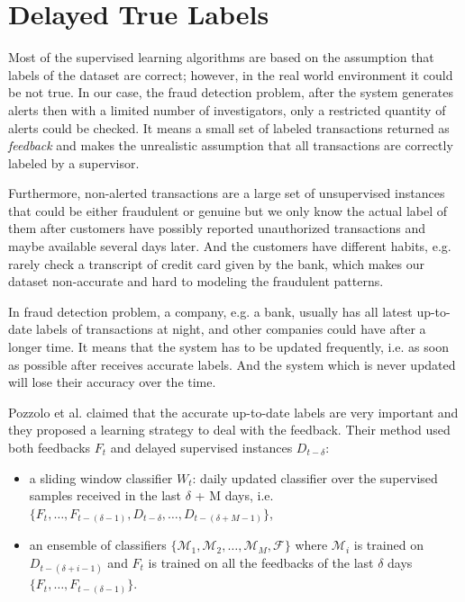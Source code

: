 \section{Delayed True Labels}
\label{delayed_true_labels}

Most of the supervised learning algorithms are based on the assumption that labels of the dataset are correct; however, in the real world environment it could be not true. In our case, the fraud detection problem, after the system generates alerts then with a limited number of investigators, only a restricted quantity of alerts could be checked. It means a small set of labeled transactions returned as \textit{feedback} and makes the unrealistic assumption that all transactions are correctly labeled by a supervisor.

Furthermore, non-alerted transactions are a large set of unsupervised instances that could be either fraudulent or genuine but we only know the actual label of them after customers have possibly reported unauthorized transactions and maybe available several days later. And the customers have different habits, e.g. rarely check a transcript of credit card given by the bank, which makes our dataset non-accurate and hard to modeling the fraudulent patterns.

In fraud detection problem, a company, e.g. a bank, usually has all latest up-to-date labels of transactions at night, and other companies could have after a longer time. It means that the system has to be updated frequently, i.e. as soon as possible after receives accurate labels. And the system which is never updated will lose their accuracy over the time.

Pozzolo et al. \citep{dal2015credit} claimed that the accurate up-to-date labels are very important and they proposed a learning strategy to deal with the feedback. Their method used both feedbacks $F_t$ and delayed supervised instances $D_{t-\delta}$:

\begin{itemize}
\item  a sliding window classifier $W_t$: daily updated classifier over the supervised samples received in the last $\delta$ + M days, i.e. $ \lbrace F_t, \dots, F_{t - (\delta - 1)}, D_{t-\delta}, \dots, D_{t- (\delta + M -1)} \rbrace $,
\item an ensemble of classifiers $\lbrace \mathcal{M}_1, \mathcal{M}_2, \dots, \mathcal{M}_M, \mathcal{F} \rbrace$ where $\mathcal{M}_i$ is trained on $D_{t - ( \delta + i - 1)}$ and $F_t$ is trained on all the feedbacks of the last $\delta$ days $\lbrace F_t, \dots, F_{t - (\delta - 1)} \rbrace$.
\end{itemize}

